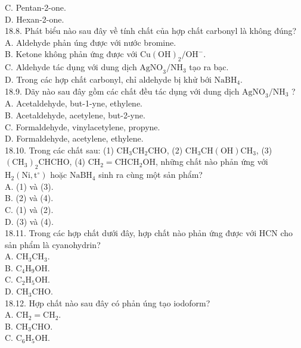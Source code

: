 \documentclass[10pt]{article}
\begin{document}
\begin{enumerate}
C. Pentan-2-one.\\
D. Hexan-2-one.\\
18.8. Phát biểu nào sau đây về tính chất của hợp chất carbonyl là không đúng?\\
A. Aldehyde phản úng được với nước bromine.\\
B. Ketone không phản ứng được với $\mathrm{Cu}(\mathrm{OH})_{2} / \mathrm{OH}^{-}$.\\
C. Aldehyde tác dụng với dung dịch $\mathrm{AgNO}_{3} / \mathrm{NH}_{3}$ tạo ra bạc.\\
D. Trong các hợp chất carbonyl, chỉ aldehyde bị khử bới $\mathrm{NaBH}_{4}$.\\
18.9. Dãy nào sau đây gồm các chất đều tác dụng với dung dịch $\mathrm{AgNO}_{3} / \mathrm{NH}_{3}$ ?\\
A. Acetaldehyde, but-1-yne, ethylene.\\
B. Acetaldehyde, acetylene, but-2-yne.\\
C. Formaldehyde, vinylacetylene, propyne.\\
D. Formaldehyde, acetylene, ethylene.\\
18.10. Trong các chất sau: (1) $\mathrm{CH}_{3} \mathrm{CH}_{2} \mathrm{CHO}$, (2) $\mathrm{CH}_{3} \mathrm{CH}(\mathrm{OH}) \mathrm{CH}_{3}$, (3) $\left(\mathrm{CH}_{3}\right)_{2} \mathrm{CHCHO}$, (4) $\mathrm{CH}_{2}=\mathrm{CHCH}_{2} \mathrm{OH}$, những chất nào phản ứng với $\mathrm{H}_{2}\left(\mathrm{Ni}, \mathrm{t}^{\circ}\right)$ hoặc $\mathrm{NaBH}_{4}$ sinh ra cùng một sản phẩm?\\
A. (1) và (3).\\
B. (2) và (4).\\
C. (1) và (2).\\
D. (3) và (4).\\
18.11. Trong các hợp chất dưới đây, hợp chất nào phản ứng được với HCN cho sản phẩm là cyanohydrin?\\
A. $\mathrm{CH}_{3} \mathrm{CH}_{3}$.\\
B. $\mathrm{C}_{4} \mathrm{H}_{9} \mathrm{OH}$.\\
C. $\mathrm{C}_{2} \mathrm{H}_{5} \mathrm{OH}$.\\
D. $\mathrm{CH}_{3} \mathrm{CHO}$.\\
18.12. Hợp chất nào sau đây có phản úng tạo iodoform?\\
A. $\mathrm{CH}_{2}=\mathrm{CH}_{2}$.\\
B. $\mathrm{CH}_{3} \mathrm{CHO}$.\\
C. $\mathrm{C}_{6} \mathrm{H}_{5} \mathrm{OH}$.\\

\end{enumerate}
\end{document}
